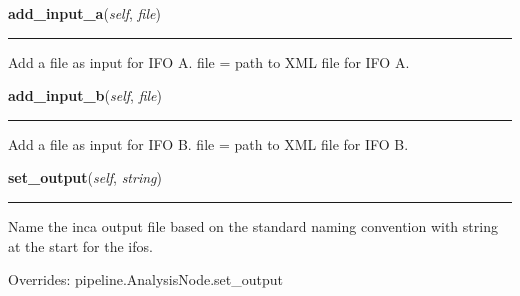     \label{inspiral:IncaNode:add_input_a}
    \vspace{0.5ex}

    \noindent\begin{boxedminipage}{\textwidth}

    \raggedright \textbf{add\_input\_a}(\textit{self}, \textit{file})

    \vspace{-1.5ex}

    \rule{\textwidth}{0.5\fboxrule}
    Add a file as input for IFO A. file = path to XML file for IFO A.

    \vspace{1ex}

    \end{boxedminipage}

    \label{inspiral:IncaNode:add_input_b}
    \vspace{0.5ex}

    \noindent\begin{boxedminipage}{\textwidth}

    \raggedright \textbf{add\_input\_b}(\textit{self}, \textit{file})

    \vspace{-1.5ex}

    \rule{\textwidth}{0.5\fboxrule}
    Add a file as input for IFO B. file = path to XML file for IFO B.

    \vspace{1ex}

    \end{boxedminipage}

    \label{inspiral:IncaNode:set_output}
    \vspace{0.5ex}

    \noindent\begin{boxedminipage}{\textwidth}

    \raggedright \textbf{set\_output}(\textit{self}, \textit{string})

    \vspace{-1.5ex}

    \rule{\textwidth}{0.5\fboxrule}
    Name the inca output file based on the standard naming convention 
    with string at the start for the ifos.

    \vspace{1ex}

      Overrides: pipeline.AnalysisNode.set\_output

    \end{boxedminipage}


